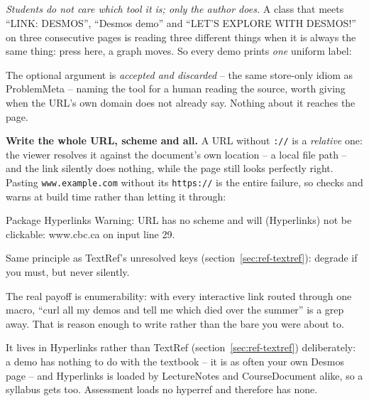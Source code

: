 \subsection*{\texorpdfstring{}{\textbackslash demo}}

\emph{Students do not care which tool it is; only the author does.} A
class that meets ``LINK: DESMOS'', ``Desmos demo'' and ``LET'S EXPLORE
WITH DESMOS!'' on three consecutive pages is reading three different
things when it is always the same thing: press here, a graph moves. So
every demo prints \emph{one} uniform label:

\begin{manexsource}
\end{manexsource}

The optional argument is \emph{accepted and discarded} -- the same
store-only idiom as ProblemMeta -- naming the tool for a human reading
the source, worth giving when the URL's own domain does not already say.
Nothing about it reaches the page.

\textbf{Write the whole URL, scheme and all.} A URL without
\texttt{://} is a \emph{relative} one: the viewer resolves it against the
document's own location -- a local file path -- and the link silently does
nothing, while the page still looks perfectly right. Pasting
\texttt{www.example.com} without its \texttt{https://} is the entire failure,
so  checks and warns at build time rather than letting it through:

\begin{manexsource}
Package Hyperlinks Warning: \demo URL has no scheme and will
(Hyperlinks)                not be clickable: www.cbc.ca on input line 29.
\end{manexsource}

Same principle as TextRef's unresolved keys (section~\ref{sec:ref-textref}):
degrade if you must, but never silently.

The real payoff is enumerability: with every interactive link routed
through one macro, ``curl all my demos and tell me which died over the
summer'' is a grep away. That is reason enough to write  rather
than the bare  you were about to.

It lives in Hyperlinks rather than TextRef (section~\ref{sec:ref-textref})
deliberately: a demo has nothing to do with the textbook -- it is as often
your own Desmos page -- and Hyperlinks is loaded by LectureNotes and
CourseDocument alike, so a syllabus gets  too. Assessment loads
no hyperref and therefore has none.
